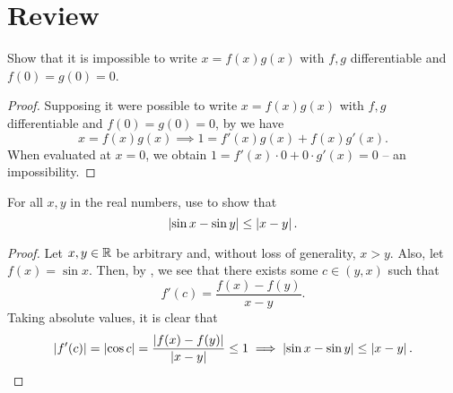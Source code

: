 \section{Review}

\begin{problem}
  Show that it is impossible to write $x = f(x)g(x)$ with $f, g$ differentiable and $f(0) = g(0) = 0$.

  \begin{proof}
    Supposing it were possible to write $x = f(x)g(x)$ with $f, g$ differentiable and $f(0) = g(0) = 0$,
    by  we have
    \[
      x = f(x)g(x) \implies 1 = f'(x)g(x) + f(x)g'(x).
    \]
    When evaluated at $x = 0$, we obtain $1 = f'(x) \cdot 0 + 0 \cdot g'(x) = 0$ -- an impossibility.
  \end{proof}
\end{problem}

\begin{problem}
  For all $x, y$ in the real numbers, use  to show that
  \[
    \left\lvert \sin{x} - \sin{y} \right\rvert \leq \left\lvert x - y \right\rvert.
  \]

  \begin{proof}
    Let $x, y \in \mathbb{R}$ be arbitrary and, without loss of generality, $x > y$. Also, let $f(x) = \sin{x}$.
    Then, by , we see that there exists some $c \in (y, x)$
    such that
    \[
      f'(c) = \frac{f(x) - f(y)}{x - y}.
    \]
    Taking absolute values, it is clear that 
    \[
      \left\lvert f'(c) \right\rvert = \left\lvert \cos{c} \right\rvert = \frac{\left\lvert f(x) - f(y) \right\rvert}{\left\lvert x - y \right\rvert} \leq 1 \implies \left\lvert \sin{x} - \sin{y} \right\rvert \leq \left\lvert x - y \right\rvert.
    \]
  \end{proof}
\end{problem}

